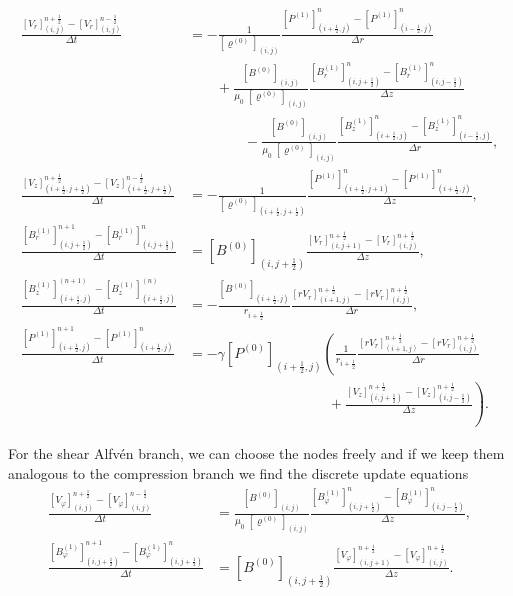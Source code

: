 \begin{align}
    \label{eq: discrete 2D mom r}
    \frac{[V_r]_{(i,j)}^{n+\frac{1}{2}}-[V_r]_{(i,j)}^{n-\frac12}}{\Delta t}
    &=  -\frac{1}{[\varrho^{(0)}]_{(i,j)}}
            \frac{[P^{(1)}]_{(i+\frac12,j)}^{n} - [P^{(1)}]_{(i-\frac12,j)}^{n}}{\Delta r}\nonumber \\
        &\qquad
        +\frac{[B^{(0)}]_{(i,j)}}{\mu_0 \;[\varrho^{(0)}]_{(i,j)}}
             \frac{[B_r^{(1)}]_{(i,j+\frac12)}^{n} - [B_r^{(1)}]_{(i,j-\frac12)}^{n}}{\Delta z}\nonumber\\
        &\qquad\qquad
        -\frac{[B^{(0)}]_{(i,j)}}{\mu_0 \; [\varrho^{(0)}]_{(i,j)}}
             \frac{[B_z^{(1)}]_{(i+\frac12,j)}^{n} - [B_z^{(1)}]_{(i-\frac12,j)}^{n}}{\Delta r} ,\\
    \frac{[V_z]_{(i+\frac12,j+\frac12)}^{n+\frac{1}{2}}-[V_z]_{(i+\frac12,j+\frac12)}^{n-\frac12}}{\Delta t}
    &=  -\frac{1}{[\varrho^{(0)}]_{(i+\frac12,j+\frac12)}}
            \frac{[P^{(1)}]_{(i+\frac12,j+1)}^{n} - [P^{(1)}]_{(i+\frac12,j)}^{n}}{\Delta z},\nonumber\\
    \frac{[B_r^{(1)}]_{(i, j+\frac12)}^{n+1}-[B_r^{(1)}]_{(i, j+\frac12)}^{n}}{\Delta t}
    &=  [B^{(0)}]_{(i, j+\frac12)} \frac{[V_r]_{(i,j+1)}^{n+\frac12} - [V_r]_{(i,j)}^{n+\frac12}}{\Delta z},\nonumber\\
    \frac{[B_z^{(1)}]_{(i+\frac12,j)}^{(n+1)} - [B_z^{(1)}]_{(i+\frac12,j)}^{(n)}}{\Delta t}
    &= -    \frac{[B^{(0)}]_{(i+\frac12, j)}}{r_{i+\frac12}}
            \frac{[rV_r]_{(i+1,j)}^{n+\frac12}-[rV_r]_{(i,j)}^{n+\frac12}}{\Delta r},\nonumber\\
    \frac{[P^{(1)}]_{(i+\frac12,j)}^{n+1}-[P^{(1)}]_{(i+\frac12,j)}^{n}}{\Delta t}
    &= -\gamma [P^{(0)}]_{(i+\frac12,j)}
        \left(
            \frac{1}{r_{i+\frac12}}
            \frac{[rV_r]_{(i+1,j)}^{n+\frac12}-[rV_r]_{(i,j)}^{n+\frac12}}{\Delta r}\right.
            \nonumber
            \\
            &\qquad\qquad\qquad\qquad\qquad
            + \left. \frac{[V_z]_{(i,j+\frac12)}^{n+\frac12}-[V_z]_{(i,j-\frac12)}^{n+\frac12}}{\Delta z}
        \right).\nonumber
\end{align}

For the shear Alfvén branch, we can choose the nodes freely and if we keep them analogous
to the compression branch we find the discrete update equations 
\begin{align*}
    \frac{[V_\varphi]_{(i,j)}^{n+\frac{1}{2}}-[V_\varphi]_{(i,j)}^{n-\frac12}}{\Delta t}
    &=  \frac{[B^{(0)}]_{(i,j)}}{\mu_0 \;[\varrho^{(0)}]_{(i,j)}}
             \frac{[B_\varphi^{(1)}]_{(i,j+\frac12)}^{n} - [B_\varphi^{(1)}]_{(i,j-\frac12)}^{n}}{\Delta z},\\
    \frac{[B_\varphi^{(1)}]_{(i, j+\frac12)}^{n+1}-[B_\varphi^{(1)}]_{(i, j+\frac12)}^{n}}{\Delta t}
    &=  [B^{(0)}]_{(i, j+\frac12)} \frac{[V_\varphi]_{(i,j+1)}^{n+\frac12} - [V_\varphi]_{(i,j)}^{n+\frac12}}{\Delta z}.
\end{align*}

